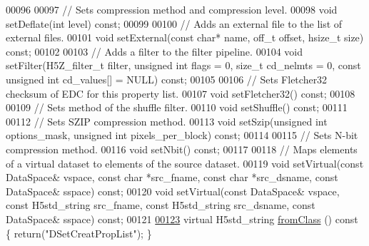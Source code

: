 \begin{DoxyCode}
00096 
00097         \textcolor{comment}{// Sets compression method and compression level.}
00098         \textcolor{keywordtype}{void} setDeflate(\textcolor{keywordtype}{int} level) \textcolor{keyword}{const};
00099 
00100         \textcolor{comment}{// Adds an external file to the list of external files.}
00101         \textcolor{keywordtype}{void} setExternal(\textcolor{keyword}{const} \textcolor{keywordtype}{char}* name, off\_t offset, hsize\_t size) \textcolor{keyword}{const};
00102 
00103         \textcolor{comment}{// Adds a filter to the filter pipeline.}
00104         \textcolor{keywordtype}{void} setFilter(H5Z\_filter\_t filter, \textcolor{keywordtype}{unsigned} \textcolor{keywordtype}{int} flags = 0, \textcolor{keywordtype}{size\_t} cd\_nelmts = 0, \textcolor{keyword}{const} \textcolor{keywordtype}{unsigned} \textcolor{keywordtype}{
      int} cd\_values[] = NULL) \textcolor{keyword}{const};
00105 
00106         \textcolor{comment}{// Sets Fletcher32 checksum of EDC for this property list.}
00107         \textcolor{keywordtype}{void} setFletcher32() \textcolor{keyword}{const};
00108 
00109         \textcolor{comment}{// Sets method of the shuffle filter.}
00110         \textcolor{keywordtype}{void} setShuffle() \textcolor{keyword}{const};
00111 
00112         \textcolor{comment}{// Sets SZIP compression method.}
00113         \textcolor{keywordtype}{void} setSzip(\textcolor{keywordtype}{unsigned} \textcolor{keywordtype}{int} options\_mask, \textcolor{keywordtype}{unsigned} \textcolor{keywordtype}{int} pixels\_per\_block) \textcolor{keyword}{const};
00114 
00115         \textcolor{comment}{// Sets N-bit compression method.}
00116         \textcolor{keywordtype}{void} setNbit() \textcolor{keyword}{const};
00117 
00118         \textcolor{comment}{// Maps elements of a virtual dataset to elements of the source dataset.}
00119         \textcolor{keywordtype}{void} setVirtual(\textcolor{keyword}{const} DataSpace& vspace, \textcolor{keyword}{const} \textcolor{keywordtype}{char} *src\_fname, \textcolor{keyword}{const} \textcolor{keywordtype}{char} *src\_dsname, \textcolor{keyword}{const} 
      DataSpace& sspace) \textcolor{keyword}{const};
00120         \textcolor{keywordtype}{void} setVirtual(\textcolor{keyword}{const} DataSpace& vspace, \textcolor{keyword}{const} H5std\_string src\_fname, \textcolor{keyword}{const} H5std\_string 
      src\_dsname, \textcolor{keyword}{const} DataSpace& sspace) \textcolor{keyword}{const};
00121 
\hyperlink{class_h5_1_1_d_set_creat_prop_list_aae0bda38c97a2ab85679caad38c4bb87}{00123}         \textcolor{keyword}{virtual} H5std\_string \hyperlink{class_h5_1_1_d_set_creat_prop_list_aae0bda38c97a2ab85679caad38c4bb87}{fromClass} ()\textcolor{keyword}{ const }\{ \textcolor{keywordflow}{return}(\textcolor{stringliteral}{"DSetCreatPropList"}); \}

\end{DoxyCode}
